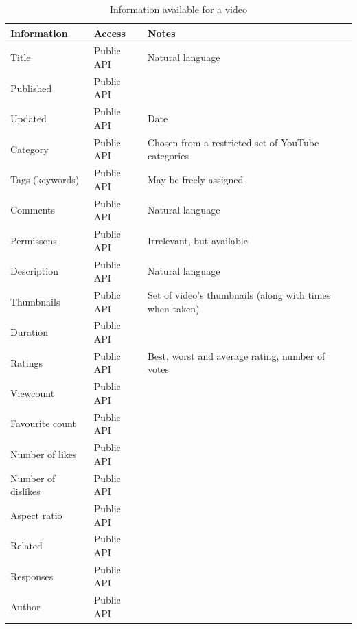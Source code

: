 \begin{table}[ht]
	\begin{tabular}{|p{3cm} | l | p{4cm}|}\hline
		Information & Access & Notes\\ \hline

		Title & Public API & Natural language \\
		Published & Public API & \\
		Updated & Public API & Date \\
		Category & Public API & Chosen from a restricted set of YouTube categories \\
		Tags (keywords) & Public API & May be freely assigned \\
		Comments & Public API & Natural language \\
		Permissons & Public API & Irrelevant, but available \\
		Description & Public API & Natural language \\
		Thumbnails & Public API & Set of video's thumbnails (along with times
		when taken) \\
		Duration & Public API & \\
		Ratings & Public API & Best, worst and average rating, number of votes \\
		Viewcount & Public API & \\
		Favourite count & Public API & \\
		Number of likes & Public API & \\
		Number of dislikes & Public API & \\
		Aspect ratio & Public API & \\
		Related & Public API & \\
		Responses & Public API & \\
		Author & Public API & \\ \hline
	\end{tabular}
	\caption{Information available for a video}
	\label{ut_video_info}
\end{table}

